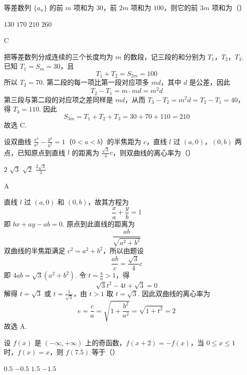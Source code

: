 \documentclass[UTF8,a4paper,oneside,11pt]{ctexbook}
\begin{document}
\begin{problem}
等差数列 \(\{a_{n}\}\) 的前 \(m\) 项和为 \(30\)，前 \(2m\) 项和为 \(100\)，则它的前 \(3m\) 项和为（\quad）

\choices
    {\(130\)}
    {\(170\)}
    {\(210\)}
    {\(260\)}
\end{problem}

\begin{answer}
C
\end{answer}

\begin{solution}
把等差数列分成连续的三个长度均为 \(m\) 的数段，记三段的和分别为 \(T_1\)，\(T_2\)，\(T_3\). 已知 \(T_1=S_m=30\)，且
\[
T_1+T_2=S_{2m}=100
\]
所以 \(T_2=70\). 第二段的每一项比第一段对应项多 \(md\)，其中 \(d\) 是公差，因此
\[
T_2-T_1=m\cdot md=m^2d
\]
第三段与第二段的对应项之差同样是 \(md\)，从而 \(T_3-T_2=m^2d=T_2-T_1=40\)，得 \(T_3=110\). 因此
\[
S_{3m}=T_1+T_2+T_3=30+70+110=210
\]
故选 C.
\end{solution}

\begin{problem}
设双曲线 \(\frac{x^2}{a^2} - \frac{y^2}{b^2} = 1\)（\(0 < a < b\)）的半焦距为 \(c\)，直线 \(l\) 过 \(\left(a, 0\right)\)，\(\left(0, b\right)\) 两点，已知原点到直线 \(l\) 的距离为 \(\frac{\sqrt{3}}{4} c\)，则双曲线的离心率为（\quad）

\choices
    {\(2\)}
    {\(\sqrt{3}\)}
    {\(\sqrt{2}\)}
    {\(\frac{2\sqrt{3}}{3}\)}
\end{problem}

\begin{answer}
A
\end{answer}

\begin{solution}
直线 \(l\) 过 \((a,0)\) 和 \((0,b)\)，故其方程为
\[
\frac{x}{a}+\frac{y}{b}=1
\]
即 \(bx+ay-ab=0\). 原点到此直线的距离为
\[
\frac{ab}{\sqrt{a^2+b^2}}
\]
双曲线的半焦距满足 \(c^2=a^2+b^2\)，所以由题设
\[
\frac{ab}{c}=\frac{\sqrt{3}}{4}c
\]
即 \(4ab=\sqrt{3}(a^2+b^2)\). 令 \(t=\frac{b}{a}>1\)，得
\[
\sqrt{3}t^2-4t+\sqrt{3}=0
\]
解得 \(t=\sqrt{3}\) 或 \(t=\frac{1}{\sqrt{3}}\)，由 \(t>1\) 取 \(t=\sqrt{3}\). 因此双曲线的离心率为
\[
e=\frac{c}{a}=\sqrt{1+\frac{b^2}{a^2}}=\sqrt{1+t^2}=2
\]
故选 A.
\end{solution}

\begin{problem}
设 \(f\left(x\right)\) 是 \(\left(-\infty, +\infty\right)\) 上的奇函数，\(f\left(x + 2\right) = -f\left(x\right)\)，当 \(0 \leqslant x \leqslant 1\) 时，\(f\left(x\right) = x\)，则 \(f\left(7.5\right)\) 等于（\quad）

\choices
    {\(0.5\)}
    {\(-0.5\)}
    {\(1.5\)}
    {\(-1.5\)}
\end{problem}
\end{document}
